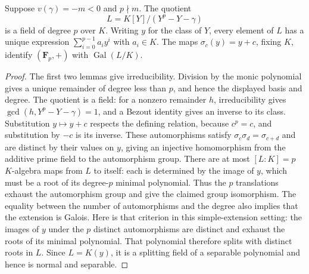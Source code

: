 \begin{lemma}
\label{lem:artin-schreier-cyclic-extension}
\leanok
Suppose $v(\gamma)=-m<0$ and $p\nmid m$. The quotient
\[
 L=K[Y]/(Y^p-Y-\gamma)
\]
is a field of degree $p$ over $K$. Writing $y$ for the class of
$Y$, every element of $L$ has a unique expression
$\sum_{i=0}^{p-1}a_i y^i$ with $a_i\in K$.
The maps $\sigma_c(y)=y+c$, fixing $K$, identify
$(\mathbf F_p,+)$ with $\operatorname{Gal}(L/K)$.
\end{lemma}

\begin{proof}
The first two lemmas give irreducibility. Division by the monic
polynomial gives a unique remainder of degree less than $p$,
and hence the displayed basis and degree. The quotient is a
field: for a nonzero remainder $h$, irreducibility gives
$\gcd(h,Y^p-Y-\gamma)=1$, and a Bezout identity gives an inverse
to its class.
Substitution $y\mapsto y+c$ respects the defining relation,
because $c^p=c$, and substitution by $-c$ is its inverse.
These automorphisms satisfy
$\sigma_c\sigma_d=\sigma_{c+d}$ and are distinct by their
values on $y$, giving an injective homomorphism from the additive
prime field to the automorphism group. There are at most $[L:K]=p$
$K$-algebra maps from $L$ to itself: each is determined by the
image of $y$, which must be a root of its degree-$p$ minimal
polynomial. Thus the $p$ translations exhaust the automorphism
group and give the claimed group isomorphism.
The equality between the number of automorphisms and the degree
also implies that the extension is Galois. Here is that criterion
in this simple-extension setting: the images of $y$ under the $p$
distinct automorphisms are distinct and exhaust the roots of its
minimal polynomial. That polynomial therefore splits with distinct
roots in $L$. Since $L=K(y)$, it is a splitting field of a separable
polynomial and hence is normal and separable.
\end{proof}

